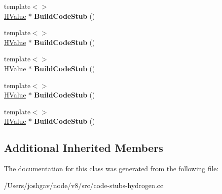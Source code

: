 \begin{DoxyCompactItemize}
\item 
{\footnotesize template$<$$>$ }\\\hyperlink{classv8_1_1internal_1_1_h_value}{H\+Value} $\ast$ {\bfseries Build\+Code\+Stub} ()\hypertarget{classv8_1_1internal_1_1_code_stub_graph_builder_aa80329e7bcf8f3693a984007ca5cbaec}{}\label{classv8_1_1internal_1_1_code_stub_graph_builder_aa80329e7bcf8f3693a984007ca5cbaec}

\item 
{\footnotesize template$<$$>$ }\\\hyperlink{classv8_1_1internal_1_1_h_value}{H\+Value} $\ast$ {\bfseries Build\+Code\+Stub} ()\hypertarget{classv8_1_1internal_1_1_code_stub_graph_builder_a3ec2034ca7129af08730d4409d6539b1}{}\label{classv8_1_1internal_1_1_code_stub_graph_builder_a3ec2034ca7129af08730d4409d6539b1}

\item 
{\footnotesize template$<$$>$ }\\\hyperlink{classv8_1_1internal_1_1_h_value}{H\+Value} $\ast$ {\bfseries Build\+Code\+Stub} ()\hypertarget{classv8_1_1internal_1_1_code_stub_graph_builder_a35d188bc90b5c27746518bd1acbc04dd}{}\label{classv8_1_1internal_1_1_code_stub_graph_builder_a35d188bc90b5c27746518bd1acbc04dd}

\item 
{\footnotesize template$<$$>$ }\\\hyperlink{classv8_1_1internal_1_1_h_value}{H\+Value} $\ast$ {\bfseries Build\+Code\+Stub} ()\hypertarget{classv8_1_1internal_1_1_code_stub_graph_builder_a3848e416aa7f2524d20c4d360264f375}{}\label{classv8_1_1internal_1_1_code_stub_graph_builder_a3848e416aa7f2524d20c4d360264f375}

\item 
{\footnotesize template$<$$>$ }\\\hyperlink{classv8_1_1internal_1_1_h_value}{H\+Value} $\ast$ {\bfseries Build\+Code\+Stub} ()\hypertarget{classv8_1_1internal_1_1_code_stub_graph_builder_a3d986afa454d1cdf22f25f9de5aeb0f2}{}\label{classv8_1_1internal_1_1_code_stub_graph_builder_a3d986afa454d1cdf22f25f9de5aeb0f2}

\end{DoxyCompactItemize}
\subsection*{Additional Inherited Members}


The documentation for this class was generated from the following file\+:\begin{DoxyCompactItemize}
\item 
/\+Users/joshgav/node/v8/src/code-\/stubs-\/hydrogen.\+cc\end{DoxyCompactItemize}
